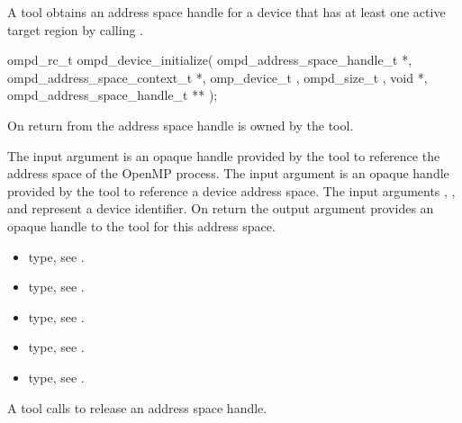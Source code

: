 \label{subsubsubsec:ompd_device_initialize}
\summary
A tool obtains an address space handle for a device that has
at least one active target region by calling
.

\format

\begin{cspecific}
\begin{ompSyntax}
ompd_rc_t ompd_device_initialize(
  ompd_address_space_handle_t *,
  ompd_address_space_context_t *,
  omp_device_t ,
  ompd_size_t ,
  void *,
  ompd_address_space_handle_t **
);
\end{ompSyntax}
\end{cspecific}


\descr
On return from  the address
space handle is owned by the tool.

\argdesc

The input argument  is an opaque handle provided by the tool
to reference the address space of the OpenMP process.
The input argument  is an opaque handle provided by the tool
to reference a device address space.
The input arguments ,  , and  represent a device identifier.
On return the output argument  provides an opaque handle to the
tool for this address space.

\crossreferences
\begin{itemize}
	\item {} type, see .
	\item {} type, see .
	\item {} type, see .
	\item {} type, see .
	\item {} type, see .
\end{itemize}




\label{subsubsubsec:ompd_release_address_space_handle}
\summary
A tool calls  to release an address space
handle.


